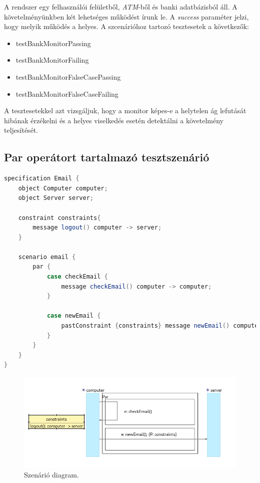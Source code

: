 A rendszer egy felhasználói felületből, \textit{ATM}-ből és banki adatbázisból áll.
A követelményünkben két lehetséges működést írunk le.
A \textit{success} paraméter jelzi, hogy melyik működés a helyes.
A szcenárióhoz tartozó tesztesetek a következők:

\begin{itemize}
    \item testBankMonitorPassing
    \item testBankMonitorFailing
    \item testBankMonitorFalseCasePassing
    \item testBankMonitorFalseCaseFailing
\end{itemize}

A tesztesetekkel azt vizsgáljuk, hogy a monitor képes-e a helytelen ág lefutását hibának érzékelni és a helyes viselkedés esetén detektálni a követelmény teljesítését.

\clearpage\subsection{Par operátort tartalmazó tesztszenárió}

\begin{lstlisting}[language=java, frame=single, float=ht!, caption={Integrációs teszteset.},captionpos=b]
specification Email {
    object Computer computer;
    object Server server;

    constraint constraints{
        message logout() computer -> server;
    }

    scenario email {
        par {
            case checkEmail {
                message checkEmail() computer -> computer;
            }

            case newEmail {
                pastConstraint {constraints} message newEmail() computer -> server;
            }
        }
    }
}
\end{lstlisting}

\begin{figure}[!ht]
    \centering
    \includegraphics[width=150mm, keepaspectratio]{figures/diagramParExample.png}
    \caption{Szenárió diagram.}
\end{figure}

